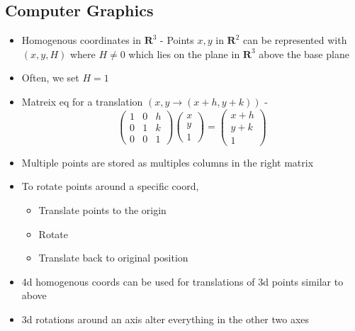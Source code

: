 \documentclass{article}
\begin{document}
\subsection{Computer Graphics}
\begin{itemize}
    \item Homogenous coordinates in \(\textbf{R}^3\) - Points \(x,y\) in \(\textbf{R}^2\) can be represented with \((x,y,H)\) where \(H\neq 0\) which lies on the plane in \(\textbf{R}^3\) above the base plane 
    \item Often, we set \(H=1\)
    \item Matreix eq for a translation \((x,y\rightarrow (x+h,y+k))\) - \[\begin{pmatrix} 1&0&h\\0&1&k\\0&0&1 \end{pmatrix} \begin{pmatrix} x\\y\\1 \end{pmatrix}=\begin{pmatrix} x+h\\y+k\\1 \end{pmatrix}\]
    \item Multiple points are stored as multiples columns in the right matrix
    \item To rotate points around a specific coord,
    \begin{itemize}
        \item Translate points to the origin 
        \item Rotate 
        \item Translate back to original position
    \end{itemize}
    \item 4d homogenous coords can be used for translations of 3d points similar to above 
    \item 3d rotations around an axis alter everything in the other two axes
\end{itemize}
\end{document}
